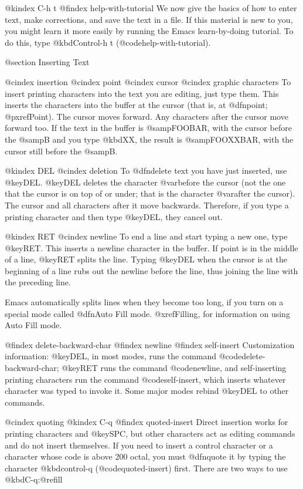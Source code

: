 {{@kindex C-h t
@findex help-with-tutorial
  We now give the basics of how to enter text, make corrections, and
save the text in a file.  If this material is new to you, you might
learn it more easily by running the Emacs learn-by-doing tutorial.  To
do this, type @kbd{Control-h t} (@code{help-with-tutorial}).

@section Inserting Text

@cindex insertion
@cindex point
@cindex cursor
@cindex graphic characters
  To insert printing characters into the text you are editing, just type
them.  This inserts the characters into the buffer at the cursor (that
is, at @dfn{point}; @pxref{Point}).  The cursor moves forward.  Any
characters after the cursor move forward too.  If the text in the buffer
is @samp{FOOBAR}, with the cursor before the @samp{B} and you type
@kbd{XX}, the result is @samp{FOOXXBAR}, with the cursor still before the
@samp{B}.

@kindex DEL
@cindex deletion
   To @dfn{delete} text you have just inserted, use @key{DEL}.
@key{DEL} deletes the character @var{before} the cursor (not the one
that the cursor is on top of or under; that is the character @var{after}
the cursor).  The cursor and all characters after it move backwards.
Therefore, if you type a printing character and then type @key{DEL},
they cancel out.

@kindex RET
@cindex newline
   To end a line and start typing a new one, type @key{RET}.  This
inserts a newline character in the buffer.  If point is in the middle of
a line, @key{RET} splits the line.  Typing @key{DEL} when the cursor is
at the beginning of a line rubs out the newline before the line, thus
joining the line with the preceding line.

  Emacs automatically splits lines when they become too long, if you
turn on a special mode called @dfn{Auto Fill} mode.  @xref{Filling}, for
information on using Auto Fill mode.

@findex delete-backward-char
@findex newline
@findex self-insert
  Customization information: @key{DEL}, in most modes, runs the command
@code{delete-backward-char}; @key{RET} runs the command @code{newline},
and self-inserting printing characters run the command
@code{self-insert}, which inserts whatever character was typed to invoke
it.  Some major modes rebind @key{DEL} to other commands.

@cindex quoting
@kindex C-q
@findex quoted-insert
  Direct insertion works for printing characters and @key{SPC}, but
other characters act as editing commands and do not insert themselves.
If you need to insert a control character or a character whose code is
above 200 octal, you must @dfn{quote} it by typing the character
@kbd{control-q} (@code{quoted-insert}) first.  There are two ways to use
@kbd{C-q}:@refill

}}
